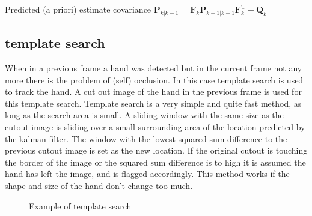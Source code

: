 Predicted (a priori) estimate covariance
$\textbf{P}_{k|k-1} = \textbf{F}_{k} \textbf{P}_{k-1|k-1} \textbf{F}_{k}^{\text{T}} + \textbf{Q}_{k}$









\subsection*{template search}
When in a previous frame a hand was detected but in the current frame not any more there is the problem of (self) occlusion. In this case template search is used to track the hand. A cut out image of the hand in the previous frame is used for this template search. Template search is a very simple and quite fast method, as long as the search area is small. A sliding window  with the same size as the cutout image is sliding over a small surrounding area of the location predicted by the kalman filter. The window with the lowest squared sum difference to the previous cutout image is set as the new location. If the original cutout is touching the border of the image or the squared sum difference is to high it is assumed the hand has left the image, and is flagged accordingly. This method works if the shape and size of the hand don't change too much.

\begin{figure}[htbp]
\begin{center}
\hspace{0.03\linewidth}

\end{center}
\caption{Example of template search}
\label{fig:templatesearch}
\end{figure}

